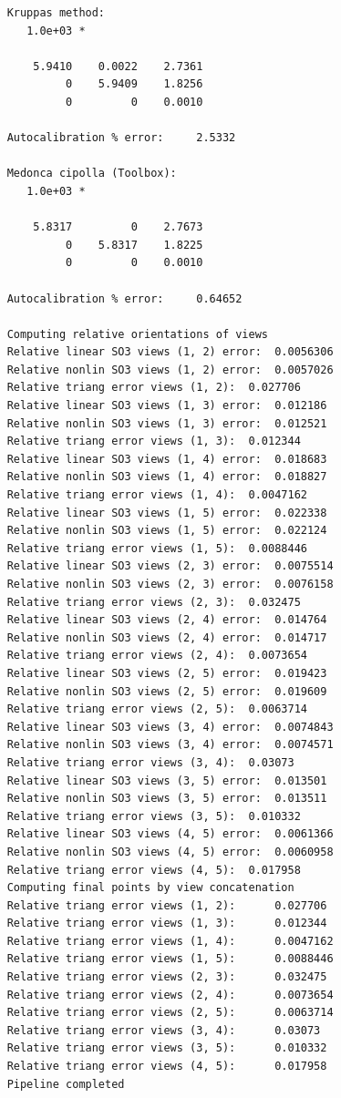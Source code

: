 \documentclass[11pt]{article}
\begin{document}
\begin{verbatim}
    Kruppas method: 
       1.0e+03 *
    
        5.9410    0.0022    2.7361
             0    5.9409    1.8256
             0         0    0.0010
    
    Autocalibration % error:	 2.5332 
    
    Medonca cipolla (Toolbox): 
       1.0e+03 *
    
        5.8317         0    2.7673
             0    5.8317    1.8225
             0         0    0.0010
    
    Autocalibration % error:	 0.64652 
    
    Computing relative orientations of views
    Relative linear SO3 views (1, 2) error:	 0.0056306 
    Relative nonlin SO3 views (1, 2) error:	 0.0057026 
    Relative triang error views (1, 2):	 0.027706 
    Relative linear SO3 views (1, 3) error:	 0.012186 
    Relative nonlin SO3 views (1, 3) error:	 0.012521 
    Relative triang error views (1, 3):	 0.012344 
    Relative linear SO3 views (1, 4) error:	 0.018683 
    Relative nonlin SO3 views (1, 4) error:	 0.018827 
    Relative triang error views (1, 4):	 0.0047162 
    Relative linear SO3 views (1, 5) error:	 0.022338 
    Relative nonlin SO3 views (1, 5) error:	 0.022124 
    Relative triang error views (1, 5):	 0.0088446 
    Relative linear SO3 views (2, 3) error:	 0.0075514 
    Relative nonlin SO3 views (2, 3) error:	 0.0076158 
    Relative triang error views (2, 3):	 0.032475 
    Relative linear SO3 views (2, 4) error:	 0.014764 
    Relative nonlin SO3 views (2, 4) error:	 0.014717 
    Relative triang error views (2, 4):	 0.0073654 
    Relative linear SO3 views (2, 5) error:	 0.019423 
    Relative nonlin SO3 views (2, 5) error:	 0.019609 
    Relative triang error views (2, 5):	 0.0063714 
    Relative linear SO3 views (3, 4) error:	 0.0074843 
    Relative nonlin SO3 views (3, 4) error:	 0.0074571 
    Relative triang error views (3, 4):	 0.03073 
    Relative linear SO3 views (3, 5) error:	 0.013501 
    Relative nonlin SO3 views (3, 5) error:	 0.013511 
    Relative triang error views (3, 5):	 0.010332 
    Relative linear SO3 views (4, 5) error:	 0.0061366 
    Relative nonlin SO3 views (4, 5) error:	 0.0060958 
    Relative triang error views (4, 5):	 0.017958 
    Computing final points by view concatenation
    Relative triang error views (1, 2):		 0.027706 
    Relative triang error views (1, 3):		 0.012344 
    Relative triang error views (1, 4):		 0.0047162 
    Relative triang error views (1, 5):		 0.0088446 
    Relative triang error views (2, 3):		 0.032475 
    Relative triang error views (2, 4):		 0.0073654 
    Relative triang error views (2, 5):		 0.0063714 
    Relative triang error views (3, 4):		 0.03073 
    Relative triang error views (3, 5):		 0.010332 
    Relative triang error views (4, 5):		 0.017958 
    Pipeline completed
\end{verbatim}
\end{document}
